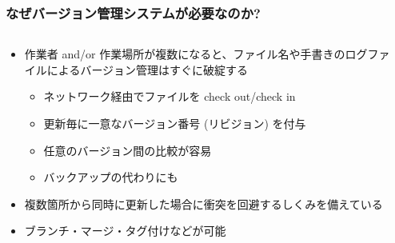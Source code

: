 \begin{frame}
  \frametitle{なぜバージョン管理システムが必要なのか?}
  \begin{columns}[T]
    \begin{column}{.7\textwidth}
      \begin{itemize}
        \setlength{\itemsep}{1em}
      \item 作業者 and/or 作業場所が複数になると、ファイル名や手書きのログファイルによるバージョン管理はすぐに破綻する
        \begin{itemize}
        \item ネットワーク経由でファイルを check out/check in
        \item 更新毎に一意なバージョン番号 (リビジョン) を付与
        \item 任意のバージョン間の比較が容易
        \item バックアップの代わりにも
        \end{itemize}
      \item 複数箇所から同時に更新した場合に衝突を回避するしくみを備えている
      \item ブランチ・マージ・タグ付けなどが可能
      \end{itemize}
    \end{column}
    \begin{column}{.25\textwidth}

\end{column}
\end{columns}
\end{frame}
